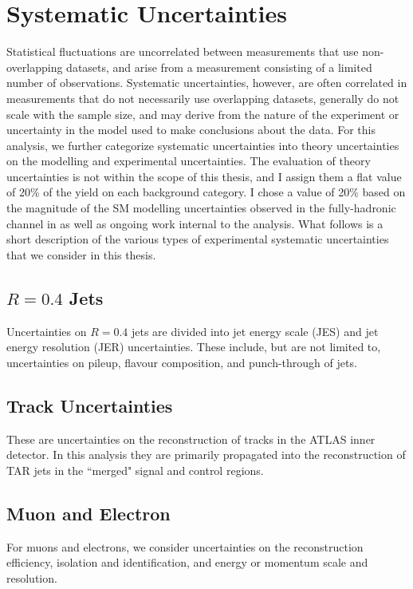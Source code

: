 \section{Systematic Uncertainties}
Statistical fluctuations are uncorrelated between measurements that use non-overlapping datasets, and arise from a measurement consisting of a limited number of observations. Systematic uncertainties, however, are often correlated in measurements that do not necessarily use overlapping datasets, generally do not scale with the sample size, and may derive from the nature of the experiment or uncertainty in the model used to make conclusions about the data.  For this analysis, we further categorize systematic uncertainties into theory uncertainties on the modelling and experimental uncertainties. The evaluation of theory uncertainties is not within the scope of this thesis, and I assign them a flat value of 20\% of the yield on each background category. I chose a value of 20\% based on the magnitude of the SM modelling uncertainties observed in the fully-hadronic channel in \cite{had_analy} as well as ongoing work internal to the analysis. What follows is a short description of the various types of experimental systematic uncertainties that we consider in this thesis.

\subsection{$R=0.4$ Jets}
Uncertainties on $R=0.4$ jets are divided into jet energy scale (JES) and jet energy resolution (JER) uncertainties. These include, but are not limited to, uncertainties on pileup, flavour composition, and punch-through of jets.

\subsection{Track Uncertainties}
These are uncertainties on the reconstruction of tracks in the ATLAS inner detector. In this analysis they are primarily propagated into the reconstruction of TAR jets in the ``merged" signal and control regions.

\subsection{Muon and Electron}
For muons and electrons, we consider uncertainties on the reconstruction efficiency, isolation and identification, and energy or momentum scale and resolution.

